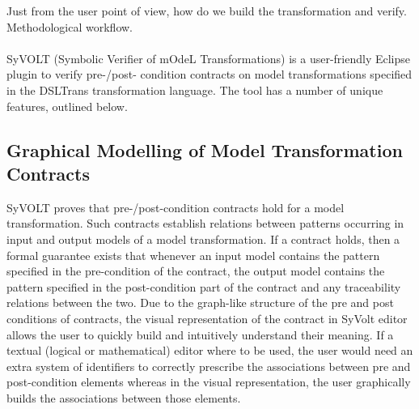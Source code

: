 Just from the user point of view, how do we build the transformation and
verify. Methodological workflow.\\\\

SyVOLT (Symbolic Verifier of mOdeL Transformations) is a user-friendly Eclipse plugin to verify pre-/post- condition contracts
on model transformations specified in the DSLTrans transformation language. The
tool has a number of unique features, outlined below.

\subsection{Graphical Modelling of Model Transformation Contracts}

 SyVOLT
proves that pre-/post-condition contracts hold for a model transformation. Such
contracts establish relations between patterns occurring in input and output
models of a model transformation. If a contract holds, then a formal guarantee
exists that whenever an input model contains the pattern specified in the
pre-condition of the contract, the output model contains the pattern specified
in the post-condition part of the contract and any traceability relations
between the two.
Due to the graph-like structure of the pre and post conditions of contracts, the
visual representation of the contract in SyVolt editor allows the user to
quickly build and intuitively understand their meaning.
If a textual (logical or mathematical) editor where to be used, the user would
need an extra system of identifiers to correctly prescribe the associations
between pre and post-condition elements whereas in the visual representation,
the user graphically builds the associations between those elements.

